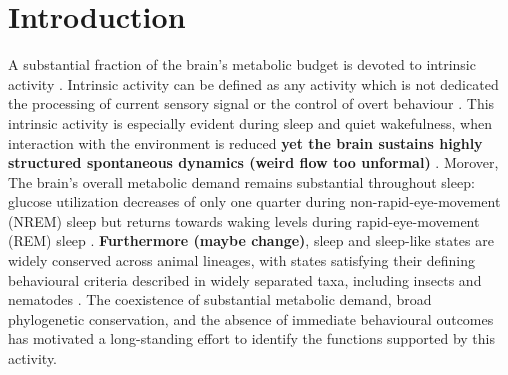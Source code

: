 \documentclass[10pt,letterpaper]{article}
\theoremstyle{plain}
\theoremstyle{remark}
\begin{document}
\linenumbers

\section{Introduction}


A substantial fraction of the brain's metabolic budget is devoted to intrinsic activity \cite{raichle2002budget,raichle2006dark}. Intrinsic activity can be defined as any activity which is not dedicated the processing of current sensory signal or the control of overt behaviour \cite{raichle2002budget,raichle2006dark}. This intrinsic activity is especially evident during sleep and quiet wakefulness, when interaction with the environment is reduced \textbf{yet the brain sustains highly structured spontaneous dynamics (weird flow too unformal)} \cite{steriade1993thalamocortical,diekelmann2010memory}. Morover, The brain's overall metabolic demand remains substantial throughout sleep: glucose utilization decreases of only one quarter during non-rapid-eye-movement (NREM) sleep but returns towards waking levels during rapid-eye-movement (REM) sleep \cite{buchsbaum1989sleep,maquet1990cerebral}. \textbf{Furthermore (maybe change)}, sleep and sleep-like states are widely conserved across animal lineages, with states satisfying their defining behavioural criteria described in widely separated taxa, including insects and nematodes \cite{cirelli2008essential}. The coexistence of substantial metabolic demand, broad phylogenetic conservation, and the absence of immediate behavioural outcomes has motivated a long-standing effort to identify the functions supported by this activity.

\end{document}
